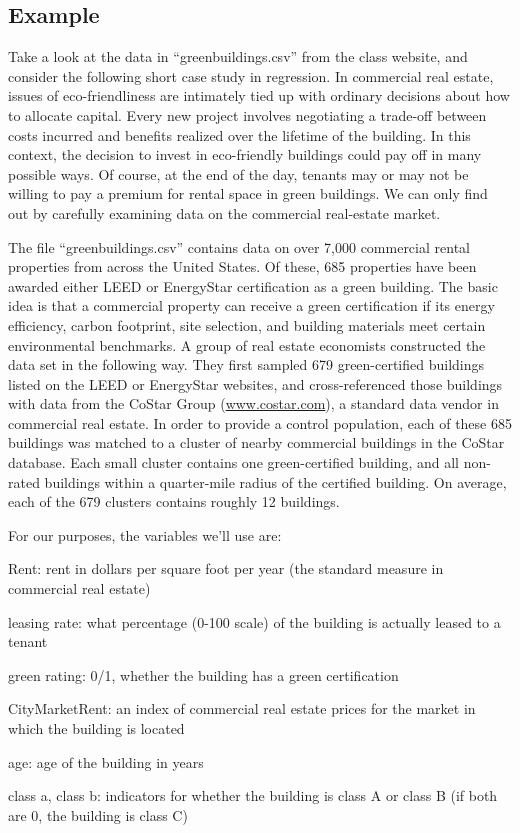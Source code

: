 \documentclass{mynotes}
\begin{document}
\subsection{Example}

 Take a look at the data in ``greenbuildings.csv'' from the class website, and consider the following short case study in regression.  In commercial real estate, issues of eco-friendliness are intimately tied up with ordinary decisions about how to allocate capital.   Every new project involves negotiating a trade-off between costs incurred and benefits realized over the lifetime of the building. In this context, the decision to invest in eco-friendly buildings could pay off in many possible ways.  Of course, at the end of the day, tenants may or may not be willing to pay a premium for rental space in green buildings.  We can only find out by carefully examining data on the commercial real-estate market.

The file ``greenbuildings.csv''  contains data on over 7,000 commercial rental properties from across the United States.  Of these, 685 properties have been awarded either LEED or EnergyStar certification as a green building.  The basic idea is that a commercial property can receive a green certification if its energy efficiency, carbon footprint, site selection, and building materials meet certain environmental benchmarks.  A group of real estate economists constructed the data set in the following way.  They first sampled 679 green-certified buildings listed on the LEED or EnergyStar websites, and cross-referenced those buildings with data from the CoStar Group (\url{www.costar.com}), a standard data vendor in commercial real estate.  In order to provide a control population, each of these 685 buildings was matched to a cluster of nearby commercial buildings in the CoStar database.  Each small cluster contains one green-certified building, and all non-rated buildings within a quarter-mile radius of the certified building.  On average, each of the 679 clusters contains roughly 12 buildings.

For our purposes, the variables we'll use are:
\begin{compactitem}
\item Rent: rent in dollars per square foot per year (the standard measure in commercial real estate)  
\item leasing rate: what percentage (0-100 scale) of the building is actually leased to a tenant
\item green rating: 0/1, whether the building has a green certification  
\item CityMarketRent: an index of commercial real estate prices for the market in which the building is located  
\item age: age of the building in years
\item class a, class b: indicators for whether the building is class A or class B (if both are 0, the building is class C)  
\end{compactitem}
\end{document}
